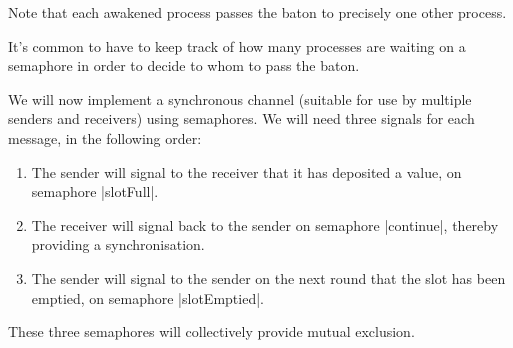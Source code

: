 
\begin{selfnote}

Note that each awakened process passes the baton to precisely one other
process. 

It's common to have to keep track of how many processes are waiting on a
semaphore in order to decide to whom to pass the baton.
\end{selfnote}


\begin{slide}

We will now implement a synchronous channel (suitable for use by multiple
senders and receivers) using semaphores.  We will need three signals for each
message, in the following order:
%
\begin{enumerate}
\item The sender will signal to the receiver that it has deposited a value, on
  semaphore |slotFull|.

\item The receiver will signal back to the sender on semaphore |continue|,
  thereby providing a synchronisation.

\item The sender will signal to the sender on the next round that the slot has
  been emptied, on semaphore |slotEmptied|.
\end{enumerate}
%
These three semaphores will collectively provide mutual exclusion.
\end{slide}


\begin{slide}

\begin{center}
\end{center}
\end{slide}


